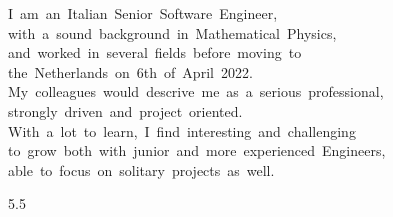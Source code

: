 \documentclass[9pt]{developercv} %
\begin{document}
\begin{minipage}[t]{0.4\textwidth} %
	\vspace{-\baselineskip} %

	\mbox{I am an Italian Senior Software Engineer,} 
	\linebreak
	\mbox{with a sound background in Mathematical Physics,}
	\mbox{and worked in several fields before moving to}
	\linebreak
	\mbox{the Netherlands on 6th of April 2022.}
	\linebreak
	\mbox{My colleagues would descrive me as a serious professional,}
	\linebreak
	\mbox{strongly driven and project oriented.}
	\linebreak
	\mbox{With a lot to learn, I find interesting and challenging}
	\linebreak
	\mbox{to grow both with junior and more experienced Engineers,}
    \linebreak
    \mbox{able to focus on solitary projects as well.}
	\linebreak
\end{minipage}
\hfill %
\begin{minipage}[t]{0.15\textwidth} %
\end{minipage}
\hfill %
\begin{minipage}[t]{0.45\textwidth} %
	\vspace{-\baselineskip} %
	\begin{barchart}{5.5}
	\end{barchart}
\end{minipage}

\end{document}
